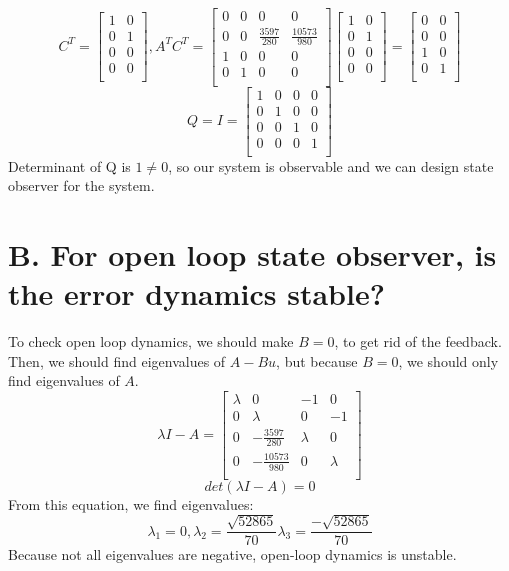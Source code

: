 \documentclass[a4paper,11pt]{article}
\theoremstyle{mytheor}
\begin{document}
\[
C^{T}=
\begin{bmatrix}
1&0\\
0&1\\
0&0\\
0&0\\
\end{bmatrix}
,A^{T}C^{T}=
\begin{bmatrix}
0&0&0&0\\
0&0&\frac{3597}{280}&\frac{10573}{980}\\
1&0&0&0\\
0&1&0&0\\
\end{bmatrix}
\begin{bmatrix}
1&0\\
0&1\\
0&0\\
0&0\\
\end{bmatrix}
=
\begin{bmatrix}
0&0\\
0&0\\
1&0\\
0&1\\
\end{bmatrix}
\]
\[
Q=I=
\begin{bmatrix}
1&0&0&0\\
0&1&0&0\\
0&0&1&0\\
0&0&0&1\\
\end{bmatrix}
\]
Determinant of Q is $1 \neq 0$, so our system is observable and we can design state observer for the system.
\section*{B. For open loop state observer, is the error dynamics stable?}
To check open loop dynamics, we should make $B=0$, to get rid of the feedback. Then, we should find eigenvalues of $A-Bu$, but because $B=0$, we should only find eigenvalues of $A$.
\[
\lambda I-A=
\begin{bmatrix}
\lambda&0&-1&0\\
0&\lambda&0&-1\\
0&-\frac{3597}{280}&\lambda&0\\
0&-\frac{10573}{980}&0&\lambda\\
\end{bmatrix}
\]
\[
det(\lambda I-A)=0  
\]
From this equation, we find eigenvalues:
\[
\lambda_{1}=0,
\lambda_{2}=\frac{\sqrt{52865}}{70}
\lambda_{3}=\frac{-\sqrt{52865}}{70}
\]
Because not all eigenvalues are negative, open-loop dynamics is unstable.
\end{document}
